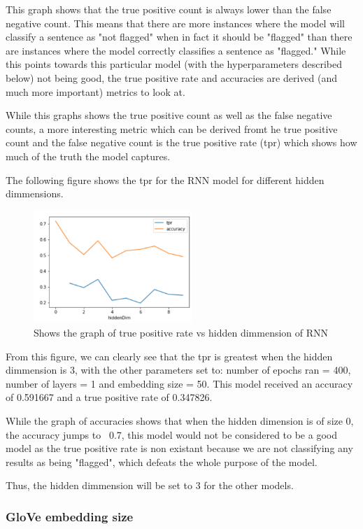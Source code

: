\documentclass[twoside,twocolumn]{article}
\begin{document}
This graph shows that the true positive count is always lower than the false negative count.
This means that there are more instances where the model will classify a sentence as "not flagged"
when in fact it should be "flagged" than there are instances where the model correctly classifies
a sentence as "flagged." While this points towards this particular model
(with the hyperparameters described below) not being good, the true positive rate and accuracies are
derived (and much more important) metrics to look at.

While this graphs shows the true positive count as well as the false negative counts,
a more interesting metric which can be derived fromt he true positive count and
the false negative count is the true positive rate (tpr) which shows how much 
of the truth the model captures.

The following figure shows the tpr for the RNN model for different hidden dimmensions.

\begin{figure}[H]
\includegraphics[width=6cm]{hidden_dimm_test_tpr-graph}
\centering
\caption{Shows the graph of true positive rate vs hidden dimmension of RNN}
\end{figure}

From this figure, we can clearly see that the tpr is greatest when the hidden dimmension is 3,
 with the other parameters set to: number of epochs ran = 400, number of layers = 1 and embedding 
 size = 50. This model received an accuracy of 0.591667 and a true positive rate of 0.347826.

While the graph of accuracies shows that when the hidden dimension is of size 0, the accuracy jumps
to ~0.7, this model would not be considered to be a good model as the true positive rate is non existant
because we are not classifying any results as being "flagged", which defeats the whole purpose of the model.

Thus, the hidden dimmension will be set to 3 for the other models.

\subsubsection{GloVe embedding size}
\end{document}
